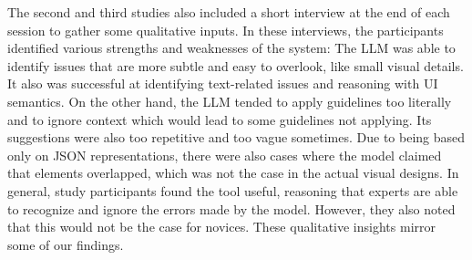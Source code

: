 \documentclass[11pt,titlepage,oneside,openany]{book}
\begin{document}
The second and third studies also included a short interview at the end of each session to gather some qualitative inputs. In these interviews, the participants identified various strengths and weaknesses of the system: The LLM was able to identify issues that are more subtle and easy to overlook, like small visual details. It also was successful at identifying text-related issues and reasoning with UI semantics. On the other hand, the LLM tended to apply guidelines too literally and to ignore context which would lead to some guidelines not applying. Its suggestions were also too repetitive and too vague sometimes. Due to being based only on JSON representations, there were also cases where the model claimed that elements overlapped, which was not the case in the actual visual designs. In general, study participants found the tool useful, reasoning that experts are able to recognize and ignore the errors made by the model. However, they also noted that this would not be the case for novices. These qualitative insights mirror some of our findings.
\end{document}
